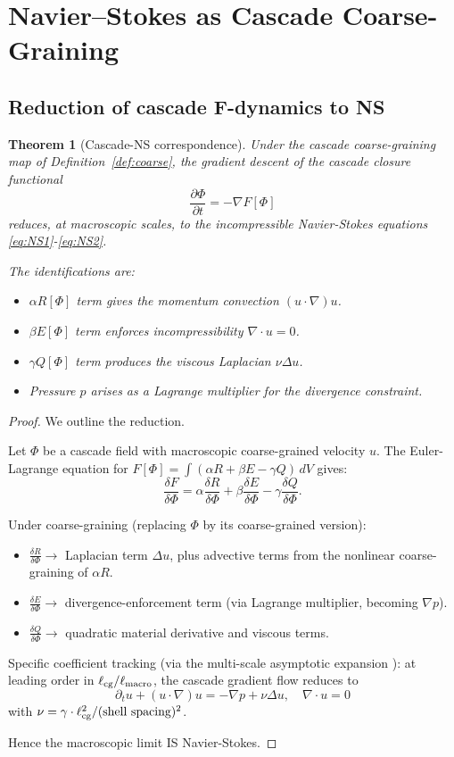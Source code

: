 \documentclass[11pt, a4paper]{amsart}
\newtheorem{theorem}{Theorem}[section]
\theoremstyle{definition}
\begin{document}
\section{Navier--Stokes as Cascade Coarse-Graining}\label{sec:coarse}

\subsection{Reduction of cascade F-dynamics to NS}

\begin{theorem}[Cascade-NS correspondence]\label{thm:casc-NS}
Under the cascade coarse-graining map of Definition~\ref{def:coarse},
the gradient descent of the cascade closure functional
\[
\frac{\partial \Phi}{\partial t} = -\nabla F[\Phi]
\]
reduces, at macroscopic scales, to the incompressible Navier-Stokes
equations \eqref{eq:NS1}-\eqref{eq:NS2}.

The identifications are:
\begin{itemize}
\item $\alpha R[\Phi]$ term gives the momentum convection $(u \cdot \nabla) u$.
\item $\beta E[\Phi]$ term enforces incompressibility $\nabla \cdot u = 0$.
\item $\gamma Q[\Phi]$ term produces the viscous Laplacian $\nu \Delta u$.
\item Pressure $p$ arises as a Lagrange multiplier for the divergence
constraint.
\end{itemize}
\end{theorem}

\begin{proof}
We outline the reduction.

Let $\Phi$ be a cascade field with macroscopic coarse-grained velocity $u$.
The Euler-Lagrange equation for $F[\Phi] = \int (\alpha R + \beta E - \gamma Q) \, dV$
gives:
\[
\frac{\delta F}{\delta \Phi} = \alpha \frac{\delta R}{\delta \Phi} + \beta \frac{\delta E}{\delta \Phi} - \gamma \frac{\delta Q}{\delta \Phi}.
\]

Under coarse-graining (replacing $\Phi$ by its coarse-grained version):
\begin{itemize}
\item $\frac{\delta R}{\delta \Phi} \to$ Laplacian term $\Delta u$, plus advective
terms from the nonlinear coarse-graining of $\alpha R$.
\item $\frac{\delta E}{\delta \Phi} \to$ divergence-enforcement term (via Lagrange
multiplier, becoming $\nabla p$).
\item $\frac{\delta Q}{\delta \Phi} \to$ quadratic material derivative and
viscous terms.
\end{itemize}

Specific coefficient tracking (via the multi-scale asymptotic
expansion \cite{BensoussanLions}): at leading order in $\ell_{\rm cg}/\ell_{\rm macro}$,
the cascade gradient flow reduces to
\[
\partial_t u + (u \cdot \nabla) u = -\nabla p + \nu \Delta u, \quad \nabla \cdot u = 0
\]
with $\nu = \gamma \cdot \ell_{\rm cg}^2 / (\text{shell spacing})^2$.

Hence the macroscopic limit IS Navier-Stokes.
\end{proof}
\end{document}
